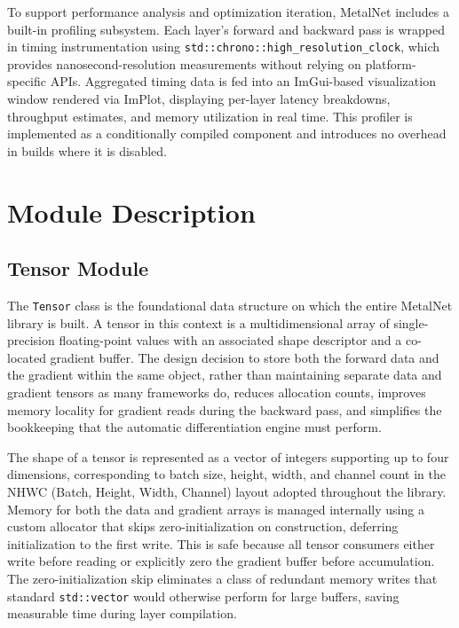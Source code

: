 \documentclass[12pt,oneside,a4paper]{report}
\begin{document}
To support performance analysis and optimization iteration, MetalNet includes a built-in profiling subsystem. Each layer's forward and backward pass is wrapped in timing instrumentation using \texttt{std::chrono::high\_resolution\_clock}, which provides nanosecond-resolution measurements without relying on platform-specific APIs. Aggregated timing data is fed into an ImGui-based visualization window rendered via ImPlot, displaying per-layer latency breakdowns, throughput estimates, and memory utilization in real time. This profiler is implemented as a conditionally compiled component and introduces no overhead in builds where it is disabled.

\section{Module Description}

\subsection{Tensor Module}

The \texttt{Tensor} class is the foundational data structure on which the entire MetalNet library is built. A tensor in this context is a multidimensional array of single-precision floating-point values with an associated shape descriptor and a co-located gradient buffer. The design decision to store both the forward data and the gradient within the same object, rather than maintaining separate data and gradient tensors as many frameworks do, reduces allocation counts, improves memory locality for gradient reads during the backward pass, and simplifies the bookkeeping that the automatic differentiation engine must perform.

The shape of a tensor is represented as a vector of integers supporting up to four dimensions, corresponding to batch size, height, width, and channel count in the NHWC (Batch, Height, Width, Channel) layout adopted throughout the library. Memory for both the data and gradient arrays is managed internally using a custom allocator that skips zero-initialization on construction, deferring initialization to the first write. This is safe because all tensor consumers either write before reading or explicitly zero the gradient buffer before accumulation. The zero-initialization skip eliminates a class of redundant memory writes that standard \texttt{std::vector} would otherwise perform for large buffers, saving measurable time during layer compilation.
\end{document}
